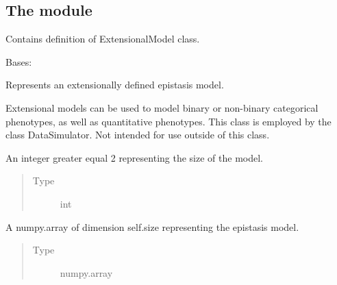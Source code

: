 \documentclass[a4paper,10pt,english]{sphinxhowto}
\begin{document}
\subsection{The module }
\label{\detokenize{utils:module-utils.extensional_model}}\label{\detokenize{utils:the-module-utils-extensional-model-py}}
Contains definition of ExtensionalModel class.

\begin{fulllineitems}
\label{\detokenize{utils:utils.extensional_model.ExtensionalModel}}
Bases: 

Represents an extensionally defined epistasis model.

Extensional models can be used to model binary or non-binary categorical phenotypes, as well as quantitative phenotypes.
This class is employed by the class DataSimulator.
Not intended for use outside of this class.

\begin{fulllineitems}
\label{\detokenize{utils:utils.extensional_model.ExtensionalModel.size}}
An integer greater equal 2 representing the size of the model.
\begin{quote}\begin{description}
\item[{Type}] \leavevmode
int

\end{description}\end{quote}

\end{fulllineitems}


\begin{fulllineitems}
\label{\detokenize{utils:utils.extensional_model.ExtensionalModel.model}}
A numpy.array of dimension self.size representing the epistasis model.
\begin{quote}\begin{description}
\item[{Type}] \leavevmode
numpy.array


\end{description}
\end{quote}
\end{fulllineitems}
\end{fulllineitems}
\end{document}
